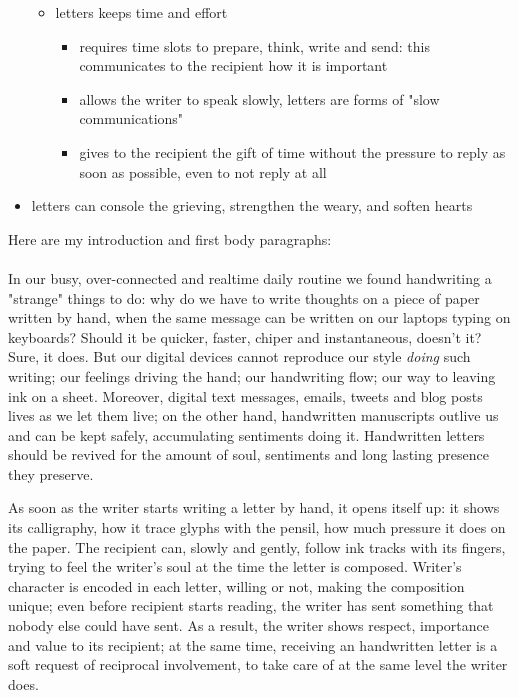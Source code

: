 \begin{itemize}
\begin{itemize}
        \item letters keeps time and effort

            \begin{itemize}
                \item requires time slots to prepare, think, write and send: this
                        communicates to the recipient how it is important
                \item allows the writer to speak slowly, letters are forms of "slow communications"
                \item gives to the recipient the gift of time without the pressure to reply
                        as soon as possible, even to not reply at all
            \end{itemize}

    \end{itemize}

    \item letters can console the grieving, strengthen the weary, and soften hearts
\end{itemize}

Here are my introduction and first body paragraphs:
\\\\
In our busy, over-connected and realtime daily routine we found handwriting a "strange"
things to do: why do we have to write thoughts on a piece of paper written by hand, when the same
message can be written on our laptops typing on keyboards? Should it be quicker, faster,
chiper and instantaneous, doesn't it? Sure, it does. But our digital devices cannot
reproduce our style \emph{doing} such writing; our feelings driving the hand; our handwriting
flow; our way to leaving ink on a sheet. Moreover, digital text messages, emails, tweets and
blog posts lives as we let them live; on the other hand, handwritten manuscripts 
outlive us and can be kept safely, accumulating sentiments doing it.
Handwritten letters should be revived for the amount of soul, sentiments and long lasting presence they preserve.

As soon as the writer starts writing a letter by hand, it opens itself up: it shows
its calligraphy, how it trace glyphs with the pensil, how much pressure it does on the paper.
The recipient can, slowly and gently, follow ink tracks with its fingers, trying 
to feel the writer's soul at the time the letter is composed. Writer's character is encoded
in each letter, willing or not, making the composition unique; even before recipient
starts reading, the writer has sent something that nobody else could have sent. 
As a result, the writer shows respect, importance and value to its recipient;
at the same time, receiving an handwritten letter is a soft request of 
reciprocal involvement, to take care of at the same level the writer does.
